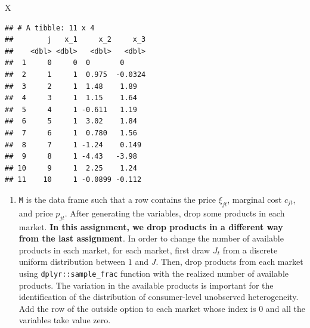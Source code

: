 \documentclass[
]{book}
\newenvironment{Shaded}{\begin{snugshade}}{\end{snugshade}}
\newcommand{\NormalTok}[1]{#1}
\providecommand{\tightlist}{%
  \setlength{\itemsep}{0pt}\setlength{\parskip}{0pt}}
\begin{document}
\begin{Shaded}
\begin{Highlighting}[]
\NormalTok{X}
\end{Highlighting}
\end{Shaded}

\begin{verbatim}
## # A tibble: 11 x 4
##        j   x_1     x_2     x_3
##    <dbl> <dbl>   <dbl>   <dbl>
##  1     0     0  0       0     
##  2     1     1  0.975  -0.0324
##  3     2     1  1.48    1.89  
##  4     3     1  1.15    1.64  
##  5     4     1 -0.611   1.19  
##  6     5     1  3.02    1.84  
##  7     6     1  0.780   1.56  
##  8     7     1 -1.24    0.149 
##  9     8     1 -4.43   -3.98  
## 10     9     1  2.25    1.24  
## 11    10     1 -0.0899 -0.112
\end{verbatim}

\begin{enumerate}
\def\labelenumi{\arabic{enumi}.}
\setcounter{enumi}{2}
\tightlist
\item
  \texttt{M} is the data frame such that a row contains the price \(\xi_{jt}\), marginal cost \(c_{jt}\), and price \(p_{jt}\). After generating the variables, drop some products in each market. \textbf{In this assignment, we drop products in a different way from the last assignment}. In order to change the number of available products in each market, for each market, first draw \(J_t\) from a discrete uniform distribution between \(1\) and \(J\). Then, drop products from each market using \texttt{dplyr::sample\_frac} function with the realized number of available products. The variation in the available products is important for the identification of the distribution of consumer-level unobserved heterogeneity. Add the row of the outside option to each market whose index is \(0\) and all the variables take value zero.
\end{enumerate}
\end{document}

